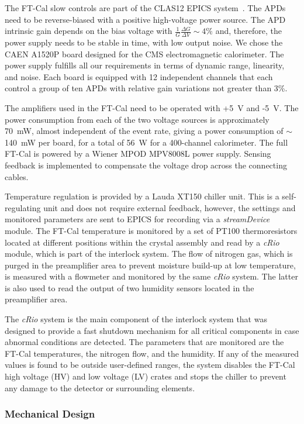 The FT-Cal slow controls are part of the CLAS12 EPICS system~\cite{daq}. The APDs need to be reverse-biased
with a positive high-voltage power source. The APD intrinsic gain depends on the bias voltage with
$\frac{1}{G}\frac{\Delta G}{\Delta V} \sim4 \%$ and, therefore, the power supply needs to be stable in time, with
low output noise. We chose the CAEN A1520P board designed for the CMS electromagnetic calorimeter. The power
supply fulfills  all our requirements in terms of dynamic range, linearity, and noise. Each board is equipped with 12
independent channels that each control a group of ten APDs with relative gain variations not greater than 3\%.

The amplifiers used in the FT-Cal need to be operated with +5~V and -5~V. The power consumption from each of the
two voltage sources is approximately 70~mW, almost independent of the event rate, giving a power consumption of
$\sim$140~mW per board, for a total of 56~W for a 400-channel calorimeter. The full FT-Cal is powered by a
Wiener MPOD MPV8008L power supply. Sensing feedback is implemented to compensate the voltage drop across the
connecting cables.

Temperature regulation is provided by a Lauda XT150 chiller unit. This is a self-regulating unit and does not require
external feedback, however, the settings and monitored parameters are sent to EPICS for recording via a
{\it streamDevice} module. The FT-Cal temperature is monitored by a set of PT100 thermoresistors located at
different positions within the crystal assembly and read by a {\it cRio} module, which is part of the interlock system.
The flow of nitrogen gas, which is purged in the preamplifier area to prevent moisture build-up at low temperature,
is measured with a flowmeter and monitored by the same {\it cRio} system. The latter is also used to read the output
of two humidity sensors located in the preamplifier area. 

The {\it cRio} system is the main component of the interlock system that was designed to provide a fast shutdown
mechanism for all critical components in case abnormal conditions are detected. The parameters that are monitored
are the FT-Cal temperatures, the nitrogen flow, and the humidity. If any of the measured values is found to be
outside user-defined ranges, the system disables the FT-Cal high voltage (HV) and low voltage (LV) crates and stops
the chiller to prevent any damage to the detector or surrounding elements.

\subsubsection{Mechanical Design}

